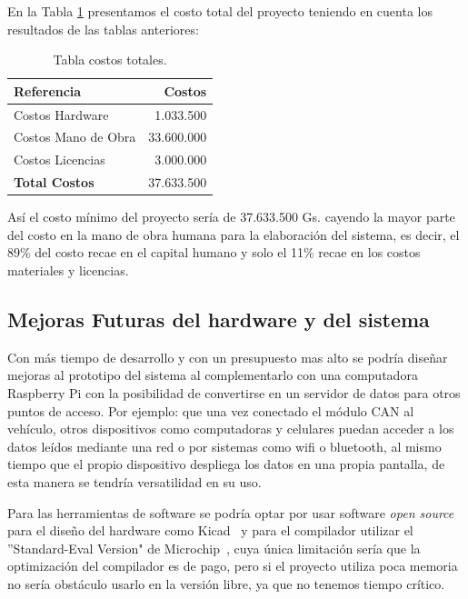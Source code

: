 En la Tabla \ref{tabla:total} presentamos el costo total del proyecto teniendo en cuenta los resultados de las tablas anteriores: 

\begin{table}[H]
\begin{center}
\begin{tabular}{l r}
\toprule
\textbf{Referencia} & \textbf{Costos}  \\ 
\midrule
Costos Hardware  & 1.033.500\\ 
Costos Mano de Obra  & 33.600.000     \\ 
Costos Licencias & 3.000.000\\ 
\textbf{Total Costos} & 37.633.500    \\ 
\bottomrule
\end{tabular}
\caption{Tabla costos totales.}
\label{tabla:total}
\end{center}
\end{table}

Así el costo mínimo del proyecto sería de 37.633.500 Gs. cayendo la mayor parte del costo en la mano de obra humana para la elaboración del sistema, es decir, el 89\% del costo recae en el capital humano y solo el 11\% recae en los costos materiales y licencias. 

\subsection{Mejoras Futuras del hardware y del sistema}

Con más tiempo de desarrollo y con un presupuesto mas alto se podría diseñar mejoras al prototipo del sistema al complementarlo con una computadora Raspberry Pi con la posibilidad de convertirse en un servidor de datos para otros puntos de acceso.
Por ejemplo: que una vez conectado el módulo CAN al vehículo, otros dispositivos como computadoras y celulares puedan acceder a los datos leídos mediante una red o por sistemas como wifi o bluetooth, al mismo tiempo que el propio dispositivo despliega los datos en una propia pantalla, de esta manera se tendría versatilidad en su uso.

Para las herramientas de software se podría optar por usar software \textit{open source} para el diseño del hardware como Kicad~\cite{kitcad} y para el compilador utilizar el ''Standard-Eval Version" de Microchip~\cite{compmicro}, cuya única limitación sería que la optimización del compilador es de pago, pero si el proyecto utiliza poca memoria no sería obstáculo usarlo en la versión libre, ya que no tenemos tiempo crítico. 

